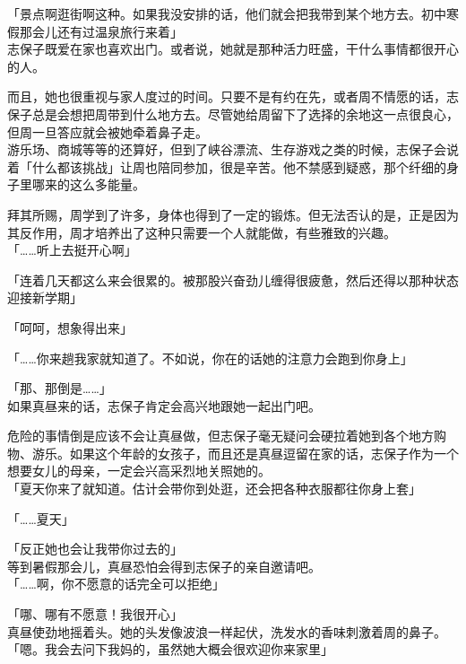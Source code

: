 「景点啊逛街啊这种。如果我没安排的话，他们就会把我带到某个地方去。初中寒假那会儿还有过温泉旅行来着」\\

志保子既爱在家也喜欢出门。或者说，她就是那种活力旺盛，干什么事情都很开心的人。

而且，她也很重视与家人度过的时间。只要不是有约在先，或者周不情愿的话，志保子总是会想把周带到什么地方去。尽管她给周留下了选择的余地这一点很良心，但周一旦答应就会被她牵着鼻子走。\\

游乐场、商城等等的还算好，但到了峡谷漂流、生存游戏之类的时候，志保子会说着「什么都该挑战」让周也陪同参加，很是辛苦。他不禁感到疑惑，那个纤细的身子里哪来的这么多能量。

拜其所赐，周学到了许多，身体也得到了一定的锻炼。但无法否认的是，正是因为其反作用，周才培养出了这种只需要一个人就能做，有些雅致的兴趣。\\

「……听上去挺开心啊」

「连着几天都这么来会很累的。被那股兴奋劲儿缠得很疲惫，然后还得以那种状态迎接新学期」

「呵呵，想象得出来」

「……你来趟我家就知道了。不如说，你在的话她的注意力会跑到你身上」

「那、那倒是……」\\

如果真昼来的话，志保子肯定会高兴地跟她一起出门吧。

危险的事情倒是应该不会让真昼做，但志保子毫无疑问会硬拉着她到各个地方购物、游乐。如果这个年龄的女孩子，而且还是真昼逗留在家的话，志保子作为一个想要女儿的母亲，一定会兴高采烈地关照她的。\\

「夏天你来了就知道。估计会带你到处逛，还会把各种衣服都往你身上套」

「……夏天」

「反正她也会让我带你过去的」\\

等到暑假那会儿，真昼恐怕会得到志保子的亲自邀请吧。\\

「……啊，你不愿意的话完全可以拒绝」

「哪、哪有不愿意！我很开心」\\

真昼使劲地摇着头。她的头发像波浪一样起伏，洗发水的香味刺激着周的鼻子。\\

「嗯。我会去问下我妈的，虽然她大概会很欢迎你来家里」

